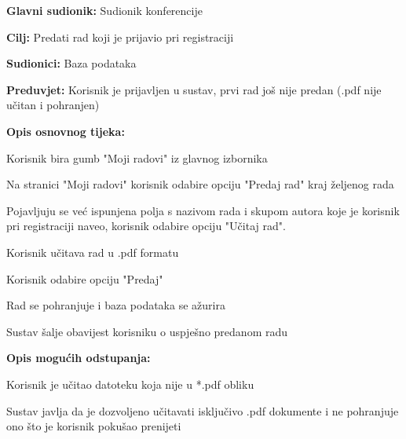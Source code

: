 				
					\noindent {}
					\begin{packed_item}
	
						\item \textbf{Glavni sudionik: } Sudionik konferencije
						\item  \textbf{Cilj:} Predati rad koji je prijavio pri registraciji
						\item  \textbf{Sudionici:} Baza podataka
						\item  \textbf{Preduvjet:} Korisnik je prijavljen u sustav, prvi rad još nije predan (.pdf nije učitan i pohranjen)
						\item  \textbf{Opis osnovnog tijeka:}
						
						\item[] \begin{packed_enum}

							\item Korisnik bira gumb "Moji radovi" iz glavnog izbornika
							\item Na stranici "Moji radovi" korisnik odabire opciju "Predaj rad" kraj željenog rada
							\item Pojavljuju se već ispunjena polja s nazivom rada i skupom autora koje je korisnik pri registraciji naveo, korisnik odabire opciju "Učitaj rad".
							\item Korisnik učitava rad u .pdf formatu
							\item Korisnik odabire opciju "Predaj"
							\item Rad se pohranjuje i baza podataka se ažurira
							\item Sustav šalje obavijest korisniku o uspješno predanom radu

					
						\end{packed_enum}

						\item  \textbf{Opis mogućih odstupanja:}
						
						\item[] \begin{packed_item}
	
							\item[4.a]  Korisnik je učitao datoteku koja nije u *.pdf obliku
							\item[] \begin{packed_enum}
								
								\item Sustav javlja da je dozvoljeno učitavati isključivo .pdf dokumente i ne pohranjuje ono što je korisnik pokušao prenijeti
								

\end{packed_enum}
\end{packed_item}
\end{packed_item}
